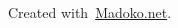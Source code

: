 \documentclass[10pt]{article}
\begin{document}
\begin{mdbmargintb}{4em}{}%
\begin{mdflushright}%
{\tiny{}Created with~\href{https://www.madoko.net}{Madoko.net}.}%
\end{mdflushright}%
\end{mdbmargintb}%
\end{document}
